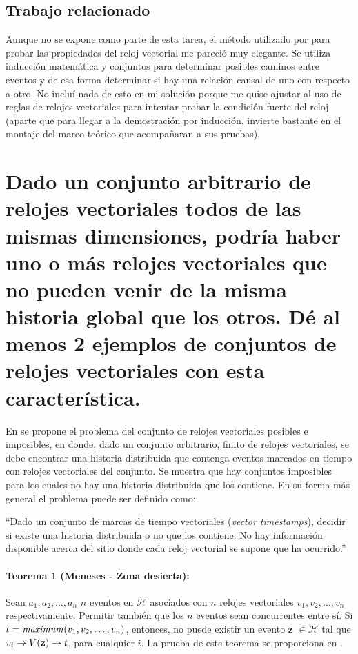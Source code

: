 \documentclass[12pt, times]{simauth}
\begin{document}
\subsection{Trabajo relacionado}
Aunque no se expone como parte de esta tarea, el método utilizado por \cite{garg} para probar las propiedades del reloj vectorial me pareció muy elegante. Se utiliza inducción matemática y 
conjuntos para determinar posibles caminos entre eventos y de esa forma determinar si hay una relación causal de uno con respecto a otro. No incluí nada de esto en mi solución porque me quise ajustar al uso de reglas de relojes vectoriales para intentar probar la condición fuerte del reloj (aparte que para llegar a la demostración por inducción, \cite{garg} invierte bastante en el montaje del marco teórico que acompañaran a sus pruebas).  

\section{Dado un conjunto arbitrario de relojes vectoriales todos de las mismas dimensiones, podría haber uno o más relojes vectoriales que no pueden venir de la misma historia global que los otros. Dé al menos 2 ejemplos de conjuntos de relojes vectoriales con esta característica.}

En \cite{meneses} se propone el problema del conjunto de relojes vectoriales posibles e imposibles, en donde, dado un conjunto arbitrario, finito de relojes vectoriales, se debe encontrar una historia distribuida que contenga eventos marcados en tiempo con relojes vectoriales del conjunto. Se muestra que hay conjuntos imposibles para los cuales no hay una historia distribuida que los contiene. En su forma más general el problema puede ser definido como: 
\begin{center}
``Dado un conjunto de marcas de tiempo vectoriales (\emph{vector timestamps}), decidir si existe una historia distribuida o no que los contiene. No hay información disponible acerca del sitio donde cada reloj vectorial se supone que ha ocurrido.''
\end{center}

\paragraph{Teorema 1 (Meneses - Zona desierta):} Sean $a_1, a_2, \dots, a_n$ $n$ eventos en $\mathcal{H}$ asociados con $n$ relojes vectoriales $v_1, v_2, \dots, v_n$ respectivamente. Permitir también que los $n$ eventos sean concurrentes entre sí. Si $t = \text{\emph{maximum}}(v_1, v_2, \dots, v_n)$, entonces, no puede existir un evento \textbf{z} $\in \mathcal{H}$ tal que $v_i \to V(\text{\textbf{z}}) \to t$, para cualquier $i$.
La prueba de este teorema se proporciona en \cite{meneses}. 
\end{document}
